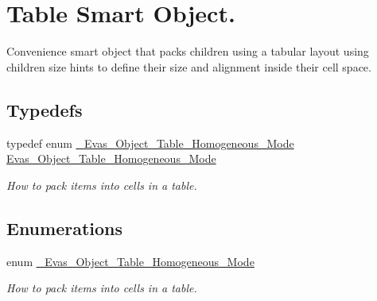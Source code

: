 \section{Table Smart Object.}
\label{group__Evas__Object__Table}


Convenience smart object that packs children using a tabular layout using children size hints to define their size and alignment inside their cell space.  


\subsection*{Typedefs}
\begin{DoxyCompactItemize}
\item 
typedef enum \hyperlink{group__Evas__Object__Table_ga536e8e3c9e38ee6d82f918a341b053a8}{\_\-Evas\_\-Object\_\-Table\_\-Homogeneous\_\-Mode} \hyperlink{group__Evas__Object__Table_ga04f33e792aea51d583c3e572a35ceebe}{Evas\_\-Object\_\-Table\_\-Homogeneous\_\-Mode}
\begin{DoxyCompactList}\small\item\em How to pack items into cells in a table. \item\end{DoxyCompactList}\end{DoxyCompactItemize}
\subsection*{Enumerations}
\begin{DoxyCompactItemize}
\item 
enum \hyperlink{group__Evas__Object__Table_ga536e8e3c9e38ee6d82f918a341b053a8}{\_\-Evas\_\-Object\_\-Table\_\-Homogeneous\_\-Mode} 
\begin{DoxyCompactList}\small\item\em How to pack items into cells in a table. \item\end{DoxyCompactList}\end{DoxyCompactItemize}
